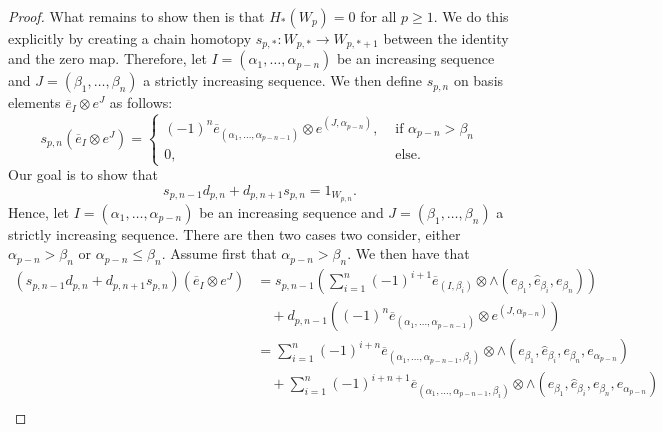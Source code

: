 \begin{proof}
  What remains to show then is that $ H_*(W_p) = 0 $ for all $ p \geq 1 $. We do this explicitly by creating a chain homotopy $ s_{p, *}: W_{p, *} \to W_{p, *+1} $ between the identity and the zero map. Therefore, let $ I=(\alpha_1, \ldots, \alpha_{p - n} ) $ be an increasing sequence and $ J = (\beta_1, \ldots, \beta_n) $ a strictly increasing sequence. We then define $ s_{p, n} $ on basis elements $ \overline{e}_{I} \otimes e^{J} $ as follows:
  \begin{equation}
    s_{p, n}(\overline{e}_I \otimes e^{J}) = \begin{cases}
      (-1)^{n}\overline{e}_{(\alpha_1, \ldots, \alpha_{p - n - 1})}\otimes e^{(J, \alpha_{p - n})}, &\text{ if } \alpha_{p - n} > \beta_n\\
      0, &\text{ else.}
    \end{cases}
  \end{equation}
  Our goal is to show that
  \begin{equation}
    s_{p, n-1}d_{p, n} + d_{p, n+1}s_{p, n} = 1_{W_{p,n}}.
  \end{equation}
  Hence, let $ I = (\alpha_1, \ldots, \alpha_{p -n}) $ be an increasing sequence and $ J = (\beta_1, \ldots, \beta_n) $ a strictly increasing sequence. There are then two cases two consider, either $ \alpha_{p - n} > \beta_n $ or $ \alpha_{p - n} \leq \beta_n $. Assume first that $ \alpha_{p -n} > \beta_n $. We then have that
  \begin{align*}
    (s_{p, n-1}d_{p, n} + d_{p, n+1}s_{p, n})(\overline{e}_{I} \otimes e^{J}) &= s_{p, n-1}\left( \sum_{i = 1}^{n} (-1)^{i + 1}\overline{e}_{(I, \beta_i)} \otimes \wedge\left(e_{\beta_1}, \widehat{e}_{\beta_i}, e_{\beta_n}\right) \right) \\
                                                                            &\quad + d_{p, n-1}\left( (-1)^{n}\overline{e}_{(\alpha_1, \ldots, \alpha_{p-n-1})} \otimes e^{(J, \alpha_{p -n})} \right) \\
                                                                            &= \sum_{i = 1}^{n} (-1)^{i + n} \overline{e}_{(\alpha_1, \ldots, \alpha_{p - n - 1}, \beta_i)} \otimes \wedge\left(e_{\beta_1}, \widehat{e}_{\beta_i}, e_{\beta_n}, e_{\alpha_{p-n}} \right) \\
                                                                            &\quad + \sum_{i = 1}^{n} (-1)^{i + n + 1}\overline{e}_{(\alpha_1, \ldots, \alpha_{p-n-1}, \beta_i)} \otimes \wedge \left( e_{\beta_1}, \widehat{e}_{\beta_i}, e_{\beta_n}, e_{\alpha_{p - n}} \right) \\

\end{align*}
\end{proof}
